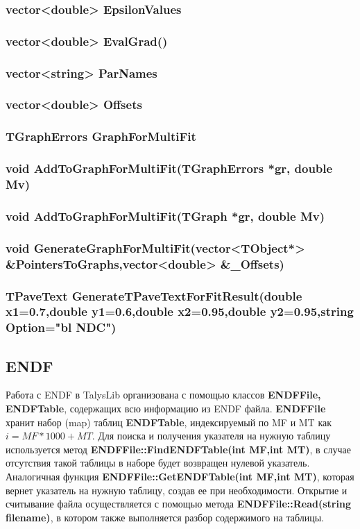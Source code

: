 \documentclass[a4paper,12pt]{extarticle}
\begin{document}
\subsubsection{vector<double> EpsilonValues}
\subsubsection{vector<double> EvalGrad()}
\subsubsection{vector<string> ParNames}
\subsubsection{vector<double> Offsets}
\subsubsection{TGraphErrors GraphForMultiFit}
\subsubsection{void AddToGraphForMultiFit(TGraphErrors *gr, double Mv)}
\subsubsection{void AddToGraphForMultiFit(TGraph *gr, double Mv)}
\subsubsection{void GenerateGraphForMultiFit(vector<TObject*> \textbf{\&}PointersToGraphs,vector<double> \textbf{\&}_Offsets)}
\subsubsection{TPaveText GenerateTPaveTextForFitResult(double x1=0.7,double y1=0.6,double x2=0.95,double y2=0.95,string Option="bl NDC")}
\subsection{ENDF}
Работа с ENDF в TalysLib организована с помощью классов \textbf{ENDFFile, ENDFTable}, содержащих всю информацию из ENDF файла. \textbf{ENDFFile} хранит набор (map) таблиц \textbf{ENDFTable}, индексируемый по MF и MT как $i=MF*1000+MT$. Для поиска и получения указателя на нужную таблицу используется метод \textbf{ENDFFile::FindENDFTable(int MF,int MT)}, в случае отсутствия такой таблицы в наборе будет возвращен нулевой указатель. Аналогичная функция \textbf{ENDFFile::GetENDFTable(int MF,int MT)}, которая вернет указатель на нужную таблицу, создав ее при необходимости.
Открытие и считывание файла осуществляется с помощью метода \textbf{ENDFFile::Read(string filename)}, в котором также выполняется разбор содержимого на таблицы.
\end{document}

